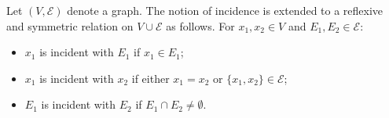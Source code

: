 Let $(V, \mathcal{E})$ denote a graph. The notion of incidence is extended to a reflexive and symmetric relation on $V \cup \mathcal{E}$ as follows. For $x_1, x_2 \in V$ and $E_1, E_2 \in \mathcal{E}$:

\begin{itemize}
\item $x_1$ is incident with $E_1$ if $x_1 \in E_1$;
\item $x_1$ is incident with $x_2$ if either $x_1 = x_2$ or $\{x_1, x_2\} \in \mathcal{E}$;
\item $E_1$ is incident with $E_2$ if $E_1 \cap E_2 \neq \emptyset$.
\end{itemize}